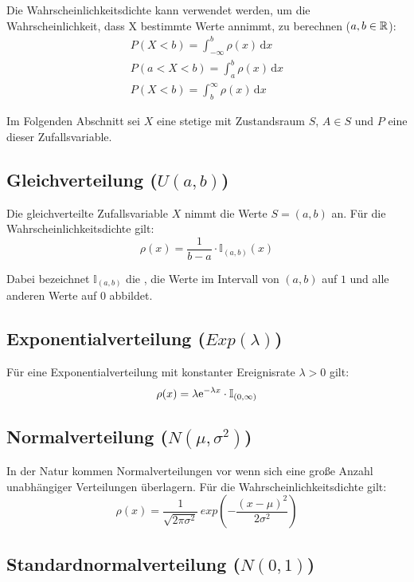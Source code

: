 Die Wahrscheinlichkeitsdichte kann verwendet werden, um die Wahrscheinlichkeit,
dass X bestimmte Werte annimmt, zu berechnen ($a,b\in\mathbb{R}$):
\begin{align*}
  P(X < b) = \int_{-\infty}^{b}\rho(x)\,\mathrm{d}x\\
  P(a<X<b) = \int_{a}^{b}\rho(x)\,\mathrm{d}x\\
  P(X < b) = \int^{\infty}_{b}\rho(x)\,\mathrm{d}x
\end{align*}

Im Folgenden Abschnitt sei $X$ eine stetige 
mit Zustandsraum $S$, $A \in S$ und $P$ eine
 dieser Zufallsvariable.


\subsection{Gleichverteilung ($U(a,b)$)}

Die gleichverteilte Zufallsvariable $X$ nimmt die Werte $S=(a,b)$ an. Für die
Wahrscheinlichkeitsdichte gilt:
\[\rho(x) = \frac{1}{b-a}\cdot\mathbb{I}_{(a,b)}(x)\]

Dabei bezeichnet $\mathbb{I}_{(a,b)}$ die , die Werte im
Intervall von $(a,b)$ auf $1$ und alle anderen Werte auf $0$ abbildet.


\subsection{Exponentialverteilung ($Exp(\lambda)$)}

Für eine Exponentialverteilung mit konstanter Ereignisrate $\lambda>0$ gilt:
\[\rho(x) = \lambda \mathrm{e}^{-\lambda x}\cdot\mathbb{I}_{(0, \infty)}\]

\subsection{Normalverteilung ($N(\mu, \sigma^2)$)}

In der Natur kommen Normalverteilungen vor wenn sich eine große Anzahl
unabhängiger Verteilungen überlagern. Für die Wahrscheinlichkeitsdichte gilt:
\[\rho(x) = \frac{1}{\sqrt{2\pi\sigma^2}}\,exp(-\frac{(x-\mu)^2}{2\sigma^2})\]


\subsection{Standardnormalverteilung ($N(0,1)$)}

